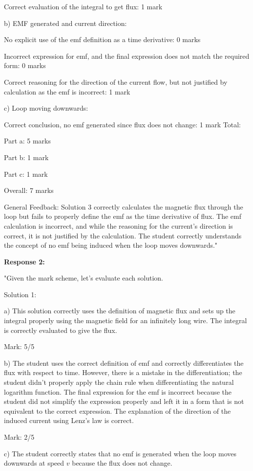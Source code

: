 \documentclass[a4paper,11pt]{article}
\begin{document}
Correct evaluation of the integral to get flux: 1 mark

b) EMF generated and current direction:

No explicit use of the emf definition as a time derivative: 0 marks

Incorrect expression for emf, and the final expression does not match the required form: 0 marks

Correct reasoning for the direction of the current flow, but not justified by calculation as the emf is incorrect: 1 mark

c) Loop moving downwards:

Correct conclusion, no emf generated since flux does not change: 1 mark
Total:

Part a: 5 marks

Part b: 1 mark

Part c: 1 mark

Overall: 7 marks

General Feedback:
Solution 3 correctly calculates the magnetic flux through the loop but fails to properly define the emf as the time derivative of flux. The emf calculation is incorrect, and while the reasoning for the current's direction is correct, it is not justified by the calculation. The student correctly understands the concept of no emf being induced when the loop moves downwards."

\textbf{Response 2:}

"Given the mark scheme, let's evaluate each solution.

Solution 1:

a) This solution correctly uses the definition of magnetic flux and sets up the integral properly using the magnetic field for an infinitely long wire. The integral is correctly evaluated to give the flux.

Mark: 5/5

b) The student uses the correct definition of emf and correctly differentiates the flux with respect to time. However, there is a mistake in the differentiation; the student didn't properly apply the chain rule when differentiating the natural logarithm function. The final expression for the emf is incorrect because the student did not simplify the expression properly and left it in a form that is not equivalent to the correct expression. The explanation of the direction of the induced current using Lenz's law is correct.

Mark: 2/5

c) The student correctly states that no emf is generated when the loop moves downwards at speed \(v\) because the flux does not change.
\end{document}
